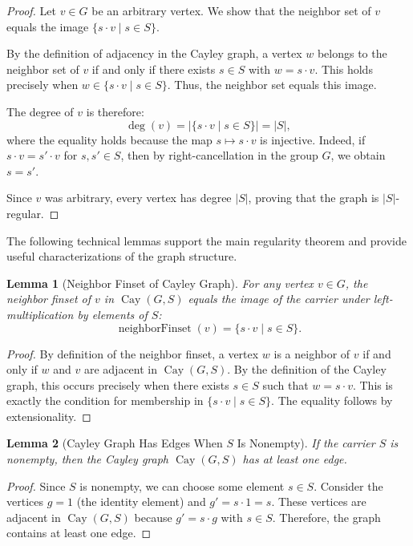 \documentclass[11pt]{article}
\theoremstyle{plain}
\newtheorem*{lemma}{Lemma}
\theoremstyle{definition}
\theoremstyle{remark}
\begin{document}
\begin{proof}
Let $v \in G$ be an arbitrary vertex. We show that the neighbor set of $v$ equals the image $\{s \cdot v \mid s \in S\}$. 

By the definition of adjacency in the Cayley graph, a vertex $w$ belongs to the neighbor set of $v$ if and only if there exists $s \in S$ with $w = s \cdot v$. This holds precisely when $w \in \{s \cdot v \mid s \in S\}$. Thus, the neighbor set equals this image.

The degree of $v$ is therefore:
\[
\deg(v) = \bigl|\{s \cdot v \mid s \in S\}\bigr| = |S|,
\]
where the equality holds because the map $s \mapsto s \cdot v$ is injective. Indeed, if $s \cdot v = s' \cdot v$ for $s, s' \in S$, then by right-cancellation in the group $G$, we obtain $s = s'$.

Since $v$ was arbitrary, every vertex has degree $|S|$, proving that the graph is $|S|$-regular.
\end{proof}

The following technical lemmas support the main regularity theorem and provide useful characterizations of the graph structure.

\begin{lemma}[Neighbor Finset of Cayley Graph]
For any vertex $v \in G$, the neighbor finset of $v$ in $\operatorname{Cay}(G, S)$ equals the image of the carrier under left-multiplication by elements of $S$:
\[
\operatorname{neighborFinset}(v) = \{s \cdot v \mid s \in S\}.
\]
\end{lemma}

\begin{proof}
By definition of the neighbor finset, a vertex $w$ is a neighbor of $v$ if and only if $w$ and $v$ are adjacent in $\operatorname{Cay}(G, S)$. By the definition of the Cayley graph, this occurs precisely when there exists $s \in S$ such that $w = s \cdot v$. This is exactly the condition for membership in $\{s \cdot v \mid s \in S\}$. The equality follows by extensionality.
\end{proof}

\begin{lemma}[Cayley Graph Has Edges When $S$ Is Nonempty]
If the carrier $S$ is nonempty, then the Cayley graph $\operatorname{Cay}(G, S)$ has at least one edge.
\end{lemma}

\begin{proof}
Since $S$ is nonempty, we can choose some element $s \in S$. Consider the vertices $g = 1$ (the identity element) and $g' = s \cdot 1 = s$. These vertices are adjacent in $\operatorname{Cay}(G, S)$ because $g' = s \cdot g$ with $s \in S$. Therefore, the graph contains at least one edge.
\end{proof}
\end{document}
